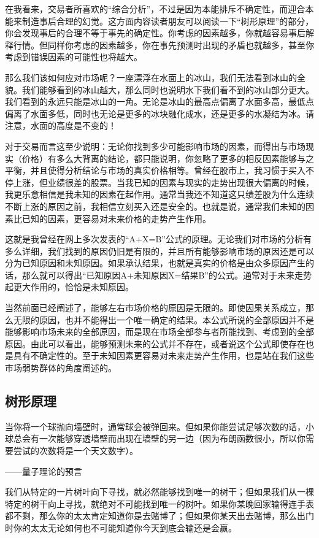 在我看来，交易者所喜欢的“综合分析”，不过是因为本能排斥不确定性，而迎合本能来制造事后合理的幻觉。这方面内容读者朋友可以阅读一下“树形原理”的部分，你会发现事后的合理不等于事先的确定性。你考虑的因素越多，你就越容易事后解释行情。但同样你考虑的因素越多，你在事先预测时出现的矛盾也就越多，甚至你考虑到错误因素的可能性也将越大。

那么我们该如何应对市场呢？一座漂浮在水面上的冰山，我们无法看到冰山的全貌。我们能够看到的冰山越大，那么同时也说明水下我们看不到的冰山部分更大。我们看到的永远只能是冰山的一角。无论是冰山的最高点偏离了水面多高，最低点偏离了水面多低，同时也无论是更多的冰块融化成水，还是更多的水凝结为冰。请注意，水面的高度是不变的！

对于交易而言这至少说明：无论你找到多少可能影响市场的因素，而得出与市场现实（价格）有多么大背离的结论，都只能说明，你忽略了更多的相反因素能够与之平衡，并且使得分析结论与市场的真实价格相等。曾经在股市上，我习惯于买入不停上涨，但业绩很差的股票。当我已知的因素与现实的走势出现很大偏离的时候，我更乐意相信是我未知的因素在起作用。通常当我还不知道这只绩差股为什么连续不断上涨的原因之前，我相信立刻买入还是安全的。也就是说，通常我们未知的因素比已知的因素，更容易对未来价格的走势产生作用。

这就是我曾经在网上多次发表的“A+X=B”公式的原理。无论我们对市场的分析有多么详细，我们找到的原因仍旧是有限的，并且所有能够影响市场的原因还是可以分为已知原因和未知原因。如果承认结果，也就是真实的价格是由众多原因产生的话，那么就可以得出“已知原因A+未知原因X=结果B”的公式。通常对于未来走势起更大作用的，恰恰是未知原因。

当然前面已经阐述了，能够左右市场价格的原因是无限的。即使因果关系成立，那么无限的原因，也并不能得出一个唯一确定的结果。本公式所说的全部原因并不是能够影响市场未来的全部原因，而是现在市场全部参与者所能找到、考虑到的全部原因。由此可以看出，能够预测未来的公式并不存在，或者说这个公式即使存在也是具有不确定性的。至于未知因素更容易对未来走势产生作用，也是站在我们这些市场弱势群体的角度阐述的。

\subsection{树形原理}

{\kaishu
当你将一个球抛向墙壁时，通常球会被弹回来。但如果你能尝试足够次数的话，小球总会有一次能够穿透墙壁而出现在墙壁的另一边（因为布朗函数很小，所以你需要尝试的次数将是一个天文数字）。

\hfill ——量子理论的预言
}

我们从特定的一片树叶向下寻找，就必然能够找到唯一的树干；但如果我们从一棵特定的树干向上寻找，就绝对不可能找到唯一的树叶。如果你某晚回家输得连手表都不剩，那么你的太太肯定知道你是去赌博了；但如果你某天出去赌博，那么出门时你的太太无论如何也不可能知道你今天到底会输还是会赢。

